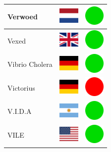 \documentclass[12pt, a4paper, twoside]{report}
\begin{document}
\begin{center}
\begin{longtable}{|p{5cm}|p{2cm}|p{2cm}|}
 Verwoed                                                    & \includegraphics[width=1cm]{../img/flags/nl} &   \includegraphics[width=1cm]{../likes/y} \\ \hline
 Vexed                                                      & \includegraphics[width=1cm]{../img/flags/gb} &   \includegraphics[width=1cm]{../likes/y} \\ \hline
 Vibrio Cholera                                             & \includegraphics[width=1cm]{../img/flags/de} &   \includegraphics[width=1cm]{../likes/y} \\ \hline
 Victorius                                                  & \includegraphics[width=1cm]{../img/flags/de} &   \includegraphics[width=1cm]{../likes/n} \\ \hline
 V.I.D.A                                                    & \includegraphics[width=1cm]{../img/flags/ar} &   \includegraphics[width=1cm]{../likes/y} \\ \hline
 VILE                                                       & \includegraphics[width=1cm]{../img/flags/us} &   \includegraphics[width=1cm]{../likes/y} \\ \hline

\end{longtable}
\end{center}
\end{document}
